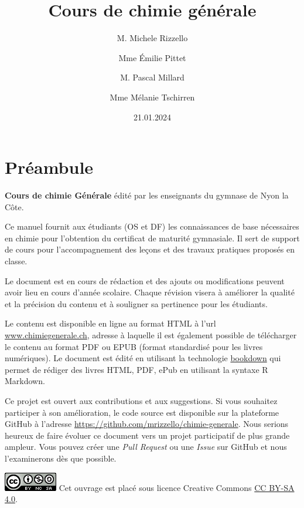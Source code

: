 \documentclass[
  11pt,
  a4paper,
  openany]{book}
\title{Cours de chimie générale}
\author{M. Michele Rizzello \and Mme Émilie Pittet \and M. Pascal Millard \and Mme Mélanie Tschirren}
\date{21.01.2024}
\begin{document}
\maketitle

{
\setcounter{tocdepth}{1}
\tableofcontents
}
\hypertarget{pruxe9ambule}{%
\chapter*{Préambule}\label{pruxe9ambule}}

\textbf{Cours de chimie Générale} édité par les enseignants du gymnase de Nyon la Côte.

Ce manuel fournit aux étudiants (OS et DF) les connaissances de base nécessaires en chimie pour l'obtention du certificat de maturité gymnasiale. Il sert de support de cours pour l'accompagnement des leçons et des travaux pratiques proposés en classe.

Le document est en cours de rédaction et des ajouts ou modifications peuvent avoir lieu en cours d'année scolaire. Chaque révision visera à améliorer la qualité et la précision du contenu et à souligner sa pertinence pour les étudiants.

Le contenu est disponible en ligne au format HTML à l'url \url{www.chimiegenerale.ch}, adresse à laquelle il est également possible de télécharger le contenu au format PDF ou EPUB (format standardisé pour les livres numériques). Le document est édité en utilisant la technologie \href{https://bookdown.org/}{bookdown} qui permet de rédiger des livres HTML, PDF, ePub en utilisant la syntaxe R Markdown.

Ce projet est ouvert aux contributions et aux suggestions. Si vous souhaitez participer à son amélioration, le code source est disponible sur la plateforme GitHub à l'adresse \url{https://github.com/mrizzello/chimie-generale}. Nous serions heureux de faire évoluer ce document vers un projet participatif de plus grande ampleur. Vous pouvez créer une \emph{Pull Request} ou une \emph{Issue} sur GitHub et nous l'examinerons dès que possible.


\includegraphics{images/by-nc-sa.png}
Cet ouvrage est placé sous licence Creative Commons \href{https://creativecommons.org/licenses/by-sa/4.0/deed.fr}{CC BY-SA 4.0}.
\end{document}
